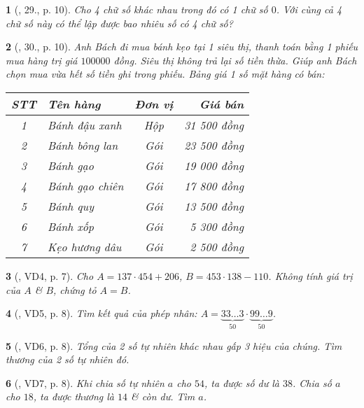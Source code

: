 \documentclass{article}
\newtheorem{baitoan}{}
\begin{document}
\begin{baitoan}[\cite{Tuyen_Toan_6}, 29., p. 10]
	Cho 4 chữ số khác nhau trong đó có 1 chữ số $0$. Với cùng cả 4 chữ số này có thể lập được bao nhiêu số có 4 chữ số?
\end{baitoan}

\begin{baitoan}[\cite{Tuyen_Toan_6}, 30., p. 10]
	Anh Bách đi mua bánh kẹo tại 1 siêu thị, thanh toán bằng 1 phiếu mua hàng trị giá $100000$ đồng. Siêu thị không trả lại số tiền thừa. Giúp anh Bách chọn mua vừa hết số tiền ghi trong phiếu. Bảng giá 1 số mặt hàng có bán:
	\begin{table}[H]
		\centering
		\begin{tabular}{|c|l|c|r|}
			\hline
			STT & Tên hàng & Đơn vị & Giá bán \\
			\hline
			1 & Bánh đậu xanh & Hộp & 31 500 đồng \\
			\hline
			2 & Bánh bông lan & Gói & 23 500 đồng \\
			\hline
			3 & Bánh gạo & Gói & 19 000 đồng \\
			\hline
			4 & Bánh gạo chiên & Gói & 17 800 đồng \\
			\hline
			5 & Bánh quy & Gói & 13 500 đồng \\
			\hline
			6 & Bánh xốp & Gói & 5 300 đồng \\
			\hline
			7 & Kẹo hương dâu & Gói & 2 500 đồng \\
			\hline
		\end{tabular}
	\end{table}
\end{baitoan}

\begin{baitoan}[\cite{Binh_Toan_6_tap_1}, VD4, p. 7]
	Cho $A = 137\cdot454 + 206$, $B = 453\cdot138 - 110$. Không tính giá trị của $A$ \& $B$, chứng tỏ $A = B$.
\end{baitoan}

\begin{baitoan}[\cite{Binh_Toan_6_tap_1}, VD5, p. 8]
	Tìm kết quả của phép nhân: $A = \underbrace{33\ldots3}_{50}\cdot\underbrace{99\ldots9}_{50}$.
\end{baitoan}

\begin{baitoan}[\cite{Binh_Toan_6_tap_1}, VD6, p. 8]
	Tổng của 2 số tự nhiên khác nhau gấp 3 hiệu của chúng. Tìm thương của 2 số tự nhiên đó.
\end{baitoan}

\begin{baitoan}[\cite{Binh_Toan_6_tap_1}, VD7, p. 8]
	Khi chia số tự nhiên $a$ cho $54$, ta được số dư là $38$. Chia số $a$ cho $18$, ta được thương là $14$ \& còn dư. Tìm $a$.
\end{baitoan}
\end{document}

